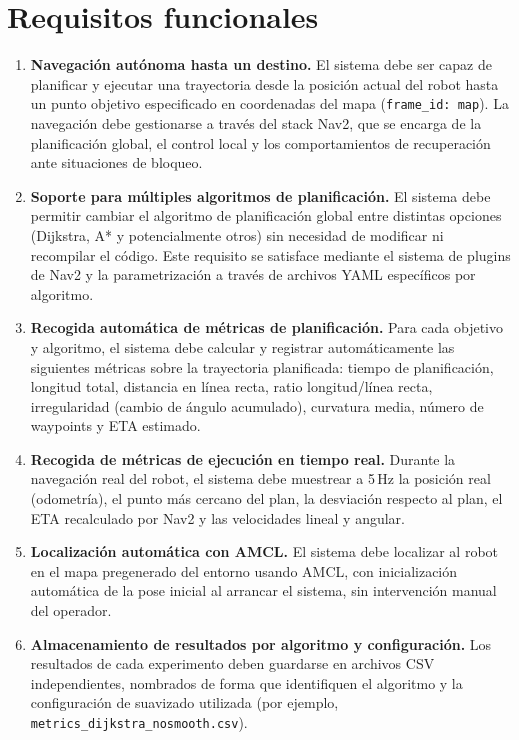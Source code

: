 \section{Requisitos funcionales}

\begin{enumerate}

    \item[\textbf{RF-01}] \textbf{Navegación autónoma hasta un destino.}
    El sistema debe ser capaz de planificar y ejecutar una trayectoria desde la posición actual del robot hasta un punto objetivo especificado en coordenadas del mapa (\texttt{frame\_id: map}). La navegación debe gestionarse a través del stack Nav2, que se encarga de la planificación global, el control local y los comportamientos de recuperación ante situaciones de bloqueo.

    \item[\textbf{RF-02}] \textbf{Soporte para múltiples algoritmos de planificación.}
    El sistema debe permitir cambiar el algoritmo de planificación global entre distintas opciones (Dijkstra, A* y potencialmente otros) sin necesidad de modificar ni recompilar el código. Este requisito se satisface mediante el sistema de plugins de Nav2 y la parametrización a través de archivos YAML específicos por algoritmo.

    \item[\textbf{RF-03}] \textbf{Recogida automática de métricas de planificación.}
    Para cada objetivo y algoritmo, el sistema debe calcular y registrar automáticamente las siguientes métricas sobre la trayectoria planificada: tiempo de planificación, longitud total, distancia en línea recta, ratio longitud/línea recta, irregularidad (cambio de ángulo acumulado), curvatura media, número de waypoints y ETA estimado.

    \item[\textbf{RF-04}] \textbf{Recogida de métricas de ejecución en tiempo real.}
    Durante la navegación real del robot, el sistema debe muestrear a 5\,Hz la posición real (odometría), el punto más cercano del plan, la desviación respecto al plan, el ETA recalculado por Nav2 y las velocidades lineal y angular.

    \item[\textbf{RF-05}] \textbf{Localización automática con AMCL.}
    El sistema debe localizar al robot en el mapa pregenerado del entorno usando AMCL, con inicialización automática de la pose inicial al arrancar el sistema, sin intervención manual del operador.

    \item[\textbf{RF-06}] \textbf{Almacenamiento de resultados por algoritmo y configuración.}
    Los resultados de cada experimento deben guardarse en archivos CSV independientes, nombrados de forma que identifiquen el algoritmo y la configuración de suavizado utilizada (por ejemplo, \texttt{metrics\_dijkstra\_nosmooth.csv}).

\end{enumerate}

